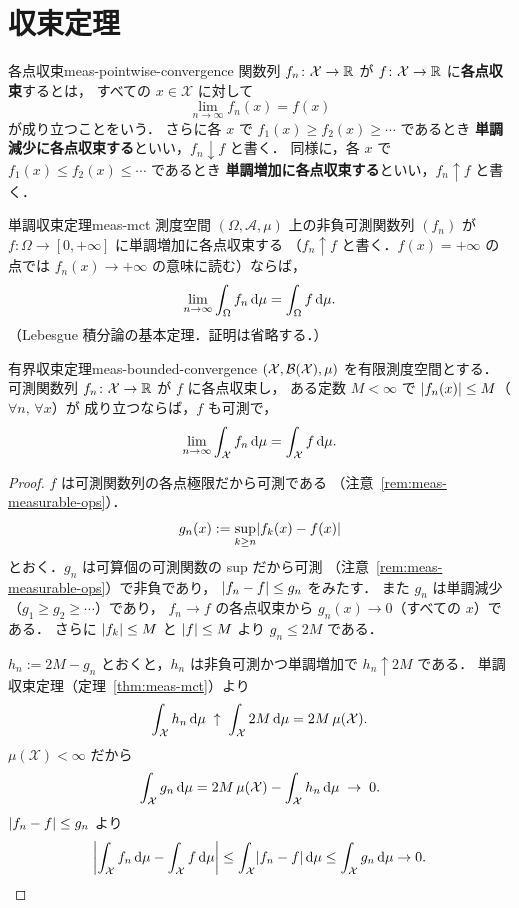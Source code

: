 \section{収束定理}

\begin{definition}{各点収束}{meas-pointwise-convergence}
  関数列 $f_n\colon \mathcal{X}\to\mathbb{R}$ が $f\colon \mathcal{X}\to\mathbb{R}$ に\textbf{各点収束}するとは，
  すべての $x\in \mathcal{X}$ に対して
  \[
    \lim_{n\to\infty}f_n(x)=f(x)
  \]
  が成り立つことをいう．
  さらに各 $x$ で $f_1(x)\geq f_2(x)\geq\cdots$ であるとき
  \textbf{単調減少に各点収束する}といい，$f_n\downarrow f$ と書く．
  同様に，各 $x$ で $f_1(x)\leq f_2(x)\leq\cdots$ であるとき
  \textbf{単調増加に各点収束する}といい，$f_n\uparrow f$ と書く．
\end{definition}

\begin{theorem}{単調収束定理}{meas-mct}
  測度空間 $(\Omega,\mathcal{A},\mu)$ 上の非負可測関数列 $(f_n)$ が
  $f\colon\Omega\to[0,+\infty]$ に単調増加に各点収束する
  （$f_n\uparrow f$ と書く．$f(x)=+\infty$ の点では
  $f_n(x)\to+\infty$ の意味に読む）ならば，
  \[
    \lim_{n\to\infty}\int_\Omega f_n\,\mathrm{d}\mu=\int_\Omega f\,\mathrm{d}\mu.
  \]
  （Lebesgue 積分論の基本定理．証明は省略する．）
\end{theorem}

\begin{theorem}{有界収束定理}{meas-bounded-convergence}
  $(\mathcal{X},\mathcal{B}(\mathcal{X}),\mu)$ を有限測度空間とする．
  可測関数列 $f_n\colon \mathcal{X}\to\mathbb{R}$ が $f$ に各点収束し，
  ある定数 $M<\infty$ で $\lvert f_n(x) \rvert\leq M$（$\forall n,\,\forall x$）が
  成り立つならば，$f$ も可測で，
  \[
    \lim_{n\to\infty}\int_{\mathcal{X}} f_n\,\mathrm{d}\mu=\int_{\mathcal{X}} f\,\mathrm{d}\mu.
  \]
\end{theorem}

\begin{proof}
  $f$ は可測関数列の各点極限だから可測である
  （注意~\ref{rem:meas-measurable-ops}）．
  \[
    g_n(x) := \sup_{k \geq n} \lvert f_k(x) - f(x) \rvert
  \]
  とおく．$g_n$ は可算個の可測関数の sup だから可測
  （注意~\ref{rem:meas-measurable-ops}）で非負であり，
  $\lvert f_n - f \rvert \leq g_n$ をみたす．
  また $g_n$ は単調減少（$g_1 \geq g_2 \geq \cdots$）であり，
  $f_n \to f$ の各点収束から $g_n(x) \to 0$（すべての $x$）である．
  さらに $\lvert f_k \rvert \leq M$ と $\lvert f \rvert \leq M$ より $g_n \leq 2M$ である．

  $h_n := 2M - g_n$ とおくと，$h_n$ は非負可測かつ単調増加で
  $h_n \uparrow 2M$ である．
  単調収束定理（定理~\ref{thm:meas-mct}）より
  \[
    \int_{\mathcal{X}} h_n \, \mathrm{d}\mu
    \;\uparrow\;
    \int_{\mathcal{X}} 2M \, \mathrm{d}\mu
    = 2M \, \mu(\mathcal{X}).
  \]
  $\mu(\mathcal{X}) < \infty$ だから
  \[
    \int_{\mathcal{X}} g_n \, \mathrm{d}\mu
    = 2M \, \mu(\mathcal{X}) - \int_{\mathcal{X}} h_n \, \mathrm{d}\mu
    \;\to\; 0.
  \]
  $\lvert f_n - f \rvert \leq g_n$ より
  \[
    \left\lvert\int_{\mathcal{X}} f_n \, \mathrm{d}\mu - \int_{\mathcal{X}} f \, \mathrm{d}\mu\right\rvert
    \leq \int_{\mathcal{X}} \lvert f_n - f \rvert \, \mathrm{d}\mu
    \leq \int_{\mathcal{X}} g_n \, \mathrm{d}\mu
    \to 0.  \qedhere
  \]
\end{proof}

